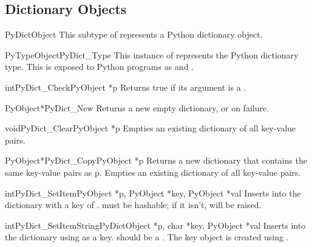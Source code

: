 \documentclass{manual}
\begin{document}


\subsection{Dictionary Objects \label{dictObjects}}

\begin{ctypedesc}{PyDictObject}
This subtype of  represents a Python dictionary object.
\end{ctypedesc}

\begin{cvardesc}{PyTypeObject}{PyDict_Type}
This instance of  represents the Python dictionary 
type.  This is exposed to Python programs as  and 
.
\end{cvardesc}

\begin{cfuncdesc}{int}{PyDict_Check}{PyObject *p}
Returns true if its argument is a .
\end{cfuncdesc}

\begin{cfuncdesc}{PyObject*}{PyDict_New}{}
Returns a new empty dictionary, or \NULL{} on failure.
\end{cfuncdesc}

\begin{cfuncdesc}{void}{PyDict_Clear}{PyObject *p}
Empties an existing dictionary of all key-value pairs.
\end{cfuncdesc}

\begin{cfuncdesc}{PyObject*}{PyDict_Copy}{PyObject *p}
Returns a new dictionary that contains the same key-value pairs as p.
Empties an existing dictionary of all key-value pairs.
\end{cfuncdesc}

\begin{cfuncdesc}{int}{PyDict_SetItem}{PyObject *p, PyObject *key,
                                       PyObject *val}
Inserts  into the dictionary with a key of .
 must be hashable; if it isn't,  will be 
raised.
\end{cfuncdesc}

\begin{cfuncdesc}{int}{PyDict_SetItemString}{PyDictObject *p,
            char *key,
            PyObject *val}
Inserts  into the dictionary using 
as a key.  should be a .  The key object is
created using .
\end{cfuncdesc}
\end{document}
